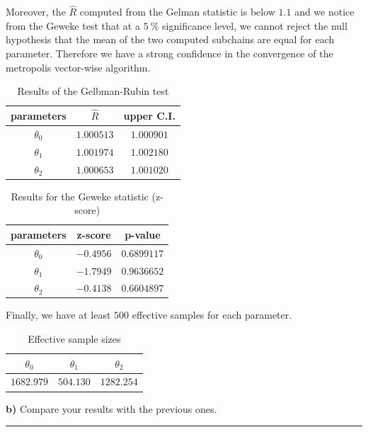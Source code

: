 Moreover, the $\hat{R}$ computed from the Gelman statistic is below $1.1$ and we notice from the Geweke test that at a $\SI{5}{\percent}$ significance level, we cannot reject the null hypothesis that the mean of the two computed subchains are equal for each parameter. Therefore we have a strong confidence in the convergence of the metropolis vector-wise algorithm.

\begin{table}[H]
	\centering\begin{tabular}{|c|c|c|} \hline 
		parameters & $\hat{R}$ & upper C.I. \\ \hline
		$\theta_0$ & $1.000513$ & $1.000901$ \\
		$\theta_1$ & $1.001974$ & $1.002180$ \\
		$\theta_2$ & $1.000653$ & $1.001020$ \\ \hline
	\end{tabular}
	\caption{Results of the Gelbman-Rubin test}
	\label{tab:metropolis-vw-gelman-rubin}
\end{table}

\begin{table}[H]
	\centering\begin{tabular}{|c|c|c|} \hline 
		parameters & z-score & p-value \\ \hline
		$\theta_0$ & $-0.4956$ & $0.6899117$ \\
		$\theta_1$ & $-1.7949$ & $0.9636652$ \\
		$\theta_2$ & $-0.4138$ & $0.6604897$ \\ \hline
	\end{tabular}
	\caption{Results for the Geweke statistic (z-score)}
	\label{tab:metropolis-cw-geweke}
\end{table}

Finally, we have at least $500$ effective samples for each parameter.

\begin{table}[H]
	\centering\begin{tabular}{|c|c|c|} \hline 
		$\theta_0$ & $\theta_1$ & $\theta_2$ \\ \hline 
		$1682.979$  & $504.130$ & $1282.254$   \\ \hline
	\end{tabular}
	\caption{Effective sample sizes}
	\label{tab:metropolis-vw-effective-sample-sizes}
\end{table}

\textbf{b)} Compare your results with the previous ones.

\begin{center}\rule{6cm}{0.4pt}\end{center}


